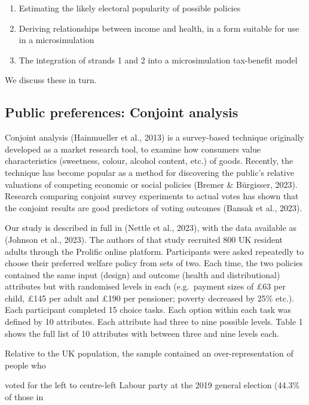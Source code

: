 \documentclass[
  letterpaper,
  DIV=11,
  numbers=noendperiod]{scrartcl}
\providecommand{\tightlist}{%
  \setlength{\itemsep}{0pt}\setlength{\parskip}{0pt}}\usepackage{longtable,booktabs,array}
\begin{document}
\begin{enumerate}
\def\labelenumi{\arabic{enumi}.}
\tightlist
\item
  Estimating the likely electoral popularity of possible policies\\
\item
  Deriving relationships between income and health, in a form suitable
  for use in a microsimulation
\item
  The integration of strands 1 and 2 into a microsimulation tax-benefit
  model
\end{enumerate}

We discuss these in turn.

\subsection{Public preferences: Conjoint
analysis}\label{public-preferences-conjoint-analysis}

Conjoint analysis (Hainmueller et al., 2013) is a survey-based technique
originally developed as a market research tool, to examine how consumers
value characteristics (sweetness, colour, alcohol content, etc.) of
goods. Recently, the technique has become popular as a method for
discovering the public's relative valuations of competing economic or
social policies (Bremer \& Bürgisser, 2023). Research comparing conjoint
survey experiments to actual votes has shown that the conjoint results
are good predictors of voting outcomes (Bansak et al., 2023).

Our study is described in full in (Nettle et al., 2023), with the data
available as (Johnson et al., 2023). The authors of that study recruited
800 UK resident adults through the Prolific online platform.
Participants were asked repeatedly to choose their preferred welfare
policy from sets of two. Each time, the two policies contained the same
input (design) and outcome (health and distributional) attributes but
with randomised levels in each (e.g.~payment sizes of £63 per child,
£145 per adult and £190 per pensioner; poverty decreased by 25\% etc.).
Each participant completed 15 choice tasks. Each option within each task
was defined by 10 attributes. Each attribute had three to nine possible
levels. Table 1 shows the full list of 10 attributes with between three
and nine levels each.

Relative to the UK population, the sample contained an
over-representation of people who

voted for the left to centre-left Labour party at the 2019 general
election (44.3\% of those in
\end{document}
